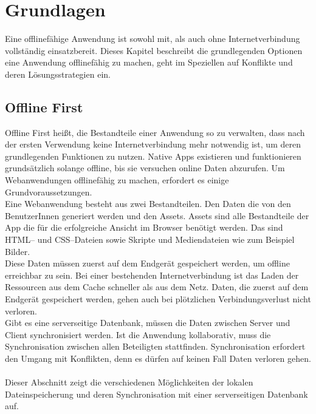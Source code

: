 \chapter{\label{chap:grundlagen}Grundlagen}
Eine offlinefähige Anwendung ist sowohl mit, als auch ohne Internetverbindung vollständig einsatzbereit.
Dieses Kapitel beschreibt die grundlegenden Optionen eine Anwendung offlinefähig zu machen, geht im Speziellen auf Konflikte und deren Lösungsstrategien ein.
%
%
\section{\label{chap:offlinefirst}Offline First}
Offline First heißt, die Bestandteile einer Anwendung so zu verwalten, dass nach der ersten Verwendung keine Internetverbindung mehr notwendig ist, um deren grundlegenden Funktionen zu nutzen.
Native \Glspl{App} existieren und funktionieren grundsätzlich solange offline, bis sie versuchen online Daten abzurufen. Um Webanwendungen offlinefähig zu machen, erfordert es einige Grundvoraussetzungen.\\
Eine Webanwendung besteht aus zwei Bestandteilen. Den Daten die von den BenutzerInnen generiert werden und den \gls{Assets}. \gls{Assets} sind alle Bestandteile der \gls{App} die für die erfolgreiche Ansicht im Browser benötigt werden. Das sind \gls{HTML}-- und \gls{CSS}--Dateien sowie Skripte und Mediendateien wie zum Beispiel Bilder.\\
Diese Daten müssen zuerst auf dem Endgerät gespeichert werden, um offline erreichbar zu sein.
Bei einer bestehenden Internetverbindung ist das Laden der Ressourcen aus dem Cache schneller als aus dem Netz. Daten, die zuerst auf dem Endgerät gespeichert werden, gehen auch bei plötzlichen Verbindungsverlust nicht verloren.\\
Gibt es eine serverseitige Datenbank, müssen die Daten zwischen Server und Client synchronisiert werden. Ist die Anwendung kollaborativ, muss die Synchronisation zwischen allen Beteiligten stattfinden. Synchronisation erfordert den Umgang mit Konflikten, denn es dürfen auf keinen Fall Daten verloren gehen.\\\\
Dieser Abschnitt zeigt die verschiedenen Möglichkeiten der lokalen Dateinspeicherung und deren Synchronisation mit einer serverseitigen Datenbank auf.
%
%

%
%

